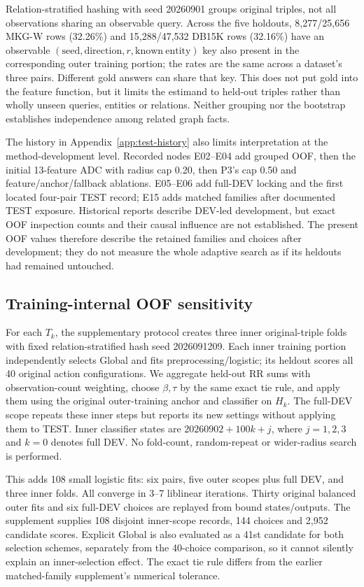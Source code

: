\documentclass[11pt,a4paper]{article}
\begin{document}
Relation-stratified hashing with seed 20260901 groups original triples, not all observations sharing an observable query. Across the five holdouts, 8,277/25,656 MKG-W rows (32.26\%) and 15,288/47,532 DB15K rows (32.16\%) have an observable $(\mathrm{seed},\mathrm{direction},r,\mathrm{known\ entity})$ key also present in the corresponding outer training portion; the rates are the same across a dataset's three pairs. Different gold answers can share that key. This does not put gold into the feature function, but it limits the estimand to held-out triples rather than wholly unseen queries, entities or relations. Neither grouping nor the bootstrap establishes independence among related graph facts.

The history in Appendix~\ref{app:test-history} also limits interpretation at the method-development level. Recorded nodes E02--E04 add grouped OOF, then the initial 13-feature ADC with radius cap 0.20, then P3's cap 0.50 and feature/anchor/fallback ablations. E05--E06 add full-DEV locking and the first located four-pair TEST record; E15 adds matched families after documented TEST exposure. Historical reports describe DEV-led development, but exact OOF inspection counts and their causal influence are not established. The present OOF values therefore describe the retained families and choices after development; they do not measure the whole adaptive search as if its heldouts had remained untouched.

\subsection{Training-internal OOF sensitivity}
For each $T_k$, the supplementary protocol creates three inner original-triple folds with fixed relation-stratified hash seed 2026091209. Each inner training portion independently selects Global and fits preprocessing/logistic; its heldout scores all 40 original action configurations. We aggregate held-out RR sums with observation-count weighting, choose $\beta,\tau$ by the same exact tie rule, and apply them using the original outer-training anchor and classifier on $H_k$. The full-DEV scope repeats these inner steps but reports its new settings without applying them to TEST. Inner classifier states are $20260902+100k+j$, where $j=1,2,3$ and $k=0$ denotes full DEV. No fold-count, random-repeat or wider-radius search is performed.

This adds 108 small logistic fits: six pairs, five outer scopes plus full DEV, and three inner folds. All converge in 3--7 liblinear iterations. Thirty original balanced outer fits and six full-DEV choices are replayed from bound states/outputs. The supplement supplies 108 disjoint inner-scope records, 144 choices and 2,952 candidate scores. Explicit Global is also evaluated as a 41st candidate for both selection schemes, separately from the 40-choice comparison, so it cannot silently explain an inner-selection effect. The exact tie rule differs from the earlier matched-family supplement's numerical tolerance.
\end{document}
